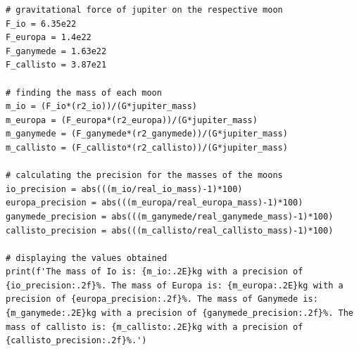 \documentclass[12pt, a4paper]{article}
\begin{document}
\begin{verbatim}
# gravitational force of jupiter on the respective moon
F_io = 6.35e22
F_europa = 1.4e22
F_ganymede = 1.63e22
F_callisto = 3.87e21

# finding the mass of each moon
m_io = (F_io*(r2_io))/(G*jupiter_mass)
m_europa = (F_europa*(r2_europa))/(G*jupiter_mass)
m_ganymede = (F_ganymede*(r2_ganymede))/(G*jupiter_mass)
m_callisto = (F_callisto*(r2_callisto))/(G*jupiter_mass)

# calculating the precision for the masses of the moons
io_precision = abs(((m_io/real_io_mass)-1)*100)
europa_precision = abs(((m_europa/real_europa_mass)-1)*100)
ganymede_precision = abs(((m_ganymede/real_ganymede_mass)-1)*100)
callisto_precision = abs(((m_callisto/real_callisto_mass)-1)*100)

# displaying the values obtained
print(f'The mass of Io is: {m_io:.2E}kg with a precision of {io_precision:.2f}%. The mass of Europa is: {m_europa:.2E}kg with a precision of {europa_precision:.2f}%. The mass of Ganymede is: {m_ganymede:.2E}kg with a precision of {ganymede_precision:.2f}%. The mass of callisto is: {m_callisto:.2E}kg with a precision of {callisto_precision:.2f}%.')
\end{verbatim}
\end{document}
